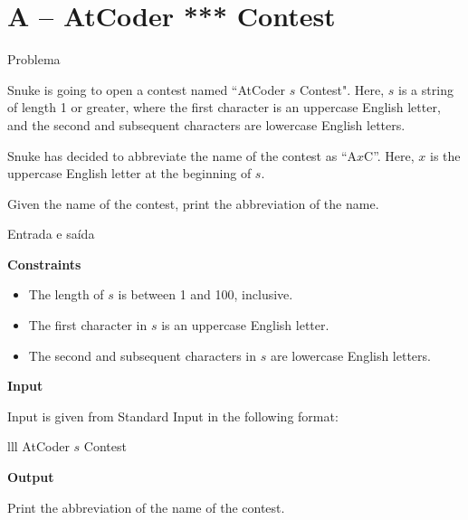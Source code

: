 \section{A -- AtCoder *** Contest}

\begin{frame}[fragile]{Problema}

Snuke is going to open a contest named ``AtCoder $s$ Contest". Here, $s$ is a string of length 
1 or greater, where the first character is an uppercase English letter, and the second and 
subsequent characters are lowercase English letters.

Snuke has decided to abbreviate the name of the contest as ``A$x$C''. Here, $x$ is the 
uppercase English letter at the beginning of $s$.

Given the name of the contest, print the abbreviation of the name.

\end{frame}

\begin{frame}[fragile]{Entrada e saída}

\textbf{Constraints}

\begin{itemize}
    \item The length of $s$ is between 1 and 100, inclusive.

    \item The first character in $s$ is an uppercase English letter.

    \item The second and subsequent characters in $s$ are lowercase English letters.
\end{itemize}

\vspace{0.1in}

\textbf{Input}

Input is given from Standard Input in the following format:
\begin{atcoderio}{lll}
AtCoder $s$ Contest \\
\end{atcoderio}

\textbf{Output}

Print the abbreviation of the name of the contest.

\end{frame}

